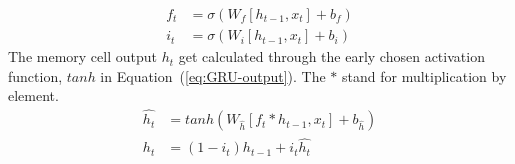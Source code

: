\begin{equation}
    \begin{split}
        f_t &= \sigma \left (W_{f} \left [h_{t-1}, x_t \right ] + b_f \right ) \\
        i_t &= \sigma \left (W_{i} \left [h_{t-1}, x_t \right ] + b_i \right )
    \end{split}
    \label{eq:GRU-gates}
\end{equation}
The memory cell output $h_t$ get calculated through the early chosen activation function, $tanh$ in \mbox{Equation~(\ref{eq:GRU-output})}.
The $\ast$ stand for multiplication by element.
\begin{equation}
    \begin{split}
        \hat{h_t} &= tanh \left (W_{\hat{h}} \left [f_t \ast h_{t-1}, x_t \right ] + b_{\hat{h}} \right ) \\
        h_t &= \left (1-i_t \right ) h_{t-1}+i_t \hat{h_t}
    \end{split}
    \label{eq:GRU-output}
\end{equation}
%
%
%
%
%

